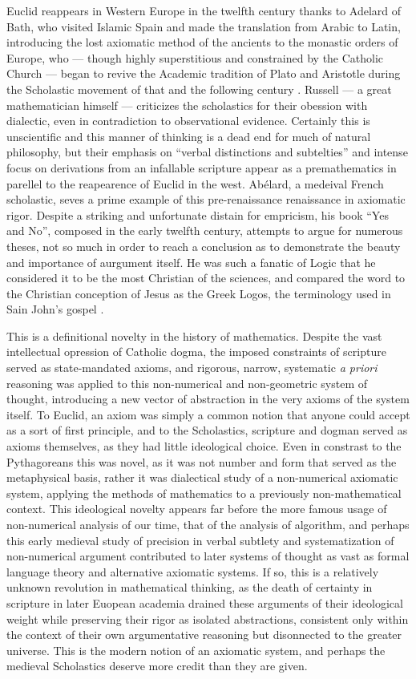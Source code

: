 \documentclass[12pt]{article}
\begin{document}
Euclid reappears in Western Europe
in the twelfth century
thanks to Adelard of Bath,
who visited Islamic Spain
and made the translation
from Arabic to Latin,
introducing the lost axiomatic method of the ancients
to the monastic orders of Europe,
who --- though highly superstitious
and constrained by the Catholic Church ---
began to revive the Academic tradition
of Plato and Aristotle during the Scholastic movement
of that and the following century \cite{russell}.
Russell --- a great mathematician himself ---
criticizes the scholastics for their obession
with dialectic, even in contradiction to observational evidence.
Certainly this is unscientific and this manner of thinking
is a dead end for much of natural philosophy,
but their emphasis on ``verbal distinctions and subtelties''
and intense focus on derivations from an infallable
scripture appear as a premathematics in parellel
to the reapearence of Euclid in the west.
Ab\'elard, a medeival French scholastic,
seves a prime example of this pre-renaissance renaissance
in axiomatic rigor.
Despite a striking and unfortunate distain for empricism,
his book ``Yes and No'',
composed in the early twelfth century,
attempts to argue for numerous theses,
not so much in order to reach a conclusion
as to demonstrate
the beauty and importance 
of aurgument itself.
He was such a fanatic of Logic
that he considered it to be the
most Christian of the sciences,
and compared the word to the Christian
conception of Jesus as the Greek Logos,
the terminology used in Sain John's gospel \cite{russell}.

This is a definitional novelty in the history of mathematics.
Despite the vast intellectual opression of Catholic dogma,
the imposed constraints of scripture served as state-mandated axioms,
and rigorous, narrow, systematic \textit{a priori} reasoning
was applied to this non-numerical and non-geometric
system of thought,
introducing a new vector of abstraction
in the very axioms of the system itself.
To Euclid, an axiom was simply a common notion
that anyone could accept as a sort of first principle,
and to the Scholastics, scripture and dogman served
as axioms themselves, as they had little ideological choice.
Even in constrast to the Pythagoreans this was novel,
as it was not number and form that served as the metaphysical basis,
rather it was dialectical study of a non-numerical axiomatic system,
applying the methods of mathematics to a previously non-mathematical context.
This ideological novelty appears far before the more famous usage
of non-numerical analysis of our time,
that of the analysis of algorithm,
and perhaps this early medieval study of precision in verbal subtlety
and systematization of non-numerical argument
contributed to later systems of thought as vast as formal language theory
and alternative axiomatic systems.
If so, this is a relatively unknown revolution in mathematical thinking,
as the death of certainty in scripture in later Euopean academia
drained these arguments of their ideological weight
while preserving their rigor as isolated abstractions,
consistent only within the context of their own argumentative reasoning
but disonnected to the greater universe.
This is the modern notion of an axiomatic system,
and perhaps the medieval Scholastics deserve more credit than they are given.
\end{document}
